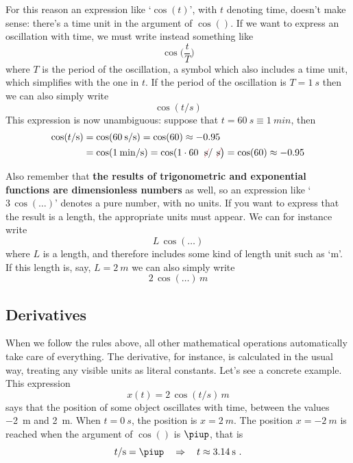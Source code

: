 \documentclass[a4paper,12pt,%
onecolumn,oneside,%
british%
]{memoir}
\newcommand*{\pu}{\piup}%
\newcommand*{\limplies}{\mathbin{\Rightarrow}}%
\renewcommand*{\|}[1][]{\nonscript\:#1\vert\nonscript\:\mathopen{}}
\begin{document}
For this reason an expression like \enquote*{$\cos(t)$}, with $t$ denoting time, doesn't make sense: there's a time unit in the argument of $\cos()$. If we want to express an oscillation with time, we must write instead something like
\begin{equation*}
  \cos\biggl(\frac{t}{T}\biggr)
\end{equation*}
where $T$ is the period of the oscillation, a symbol which also includes a time unit, which simplifies with the one in $t$. If the period of the oscillation is $T=\qty{1}{s}$ then we can also simply write
\begin{equation*}
  \cos(t/\unit{s})
\end{equation*}
This expression is now unambiguous: suppose that $t=\qty{60}{s}\equiv\qty{1}{min}$, then
\begin{equation*}
  \begin{aligned}
    \cos(t/\unit{s})
    &= \cos(\qty{60}{s}/\unit{s}) =\cos(60) \approx -0.95
    \\
    &= \cos(\qty{1}{min}/\unit{s}) =\cos(1\cdot 60\:\mathcolor{red}{\not}\!\unit{s}/\mathcolor{red}{\not}\!\unit{s}\bigr)
=\cos(60) \approx -0.95
  \end{aligned}
\end{equation*}

\medskip

Also remember that \textbf{the results of trigonometric and exponential functions are dimensionless numbers} as well, so an expression like \enquote*{$3\,\cos(\dotso)$} denotes a pure number, with no units. If you want to express that the result is a length, the appropriate units must appear. We can for instance write
\begin{equation*}
  L\,\cos(\dotso)
\end{equation*}
where $L$ is a length, and therefore includes some kind of length unit such as \enquote*{\unit{m}}. If this length is, say, $L=\qty{2}{m}$ we can also simply write
\begin{equation*}
  2\,\cos(\dotso)\,\unit{m}
\end{equation*}

\subsection{Derivatives}
\label{sec:units_derivatives}

When we follow the rules above, all other mathematical operations automatically take care of everything. The derivative, for instance, is calculated in the usual way, treating any visible units as literal constants. Let's see a concrete example. This expression
\begin{equation*}
x(t) = 2\,\cos(t/\unit{s})\,\unit{m}
\end{equation*}
says that the position of some object oscillates with time, between the values \qty{-2}{m} and \qty{+2}{m}. When $t=\qty{0}{s}$, the position is $x=\qty{+2}{m}$. The position $x=\qty{-2}{m}$ is reached when the argument of $\cos()$ is $\pu$, that is
\begin{equation*}
  t/\unit{s} = \pu \quad\limplies\quad t\approx \qty{3.14}{s} \ .
\end{equation*}
\end{document}
